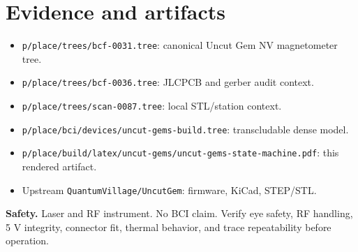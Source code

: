 \documentclass[10pt]{article}
\begin{document}
\section{Evidence and artifacts}

\begin{itemize}
\item \texttt{p/place/trees/bcf-0031.tree}: canonical Uncut Gem NV magnetometer tree.
\item \texttt{p/place/trees/bcf-0036.tree}: JLCPCB and gerber audit context.
\item \texttt{p/place/trees/scan-0087.tree}: local STL/station context.
\item \texttt{p/place/bci/devices/uncut-gems-build.tree}: transcludable dense model.
\item \texttt{p/place/build/latex/uncut-gems/uncut-gems-state-machine.pdf}: this rendered artifact.
\item Upstream \texttt{QuantumVillage/UncutGem}: firmware, KiCad, STEP/STL.
\end{itemize}

\textbf{Safety.} Laser and RF instrument. No BCI claim. Verify eye safety, RF handling,
5 V integrity, connector fit, thermal behavior, and trace repeatability before operation.
\end{document}
